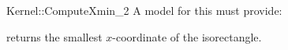 \begin{ccRefFunctionObjectConcept}{Kernel::ComputeXmin_2}
A model for this must provide:


       {returns the smallest $x$-coordinate of the isorectangle.}


\ccRefines
{}



\end{ccRefFunctionObjectConcept}
